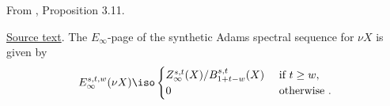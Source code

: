 \begin{proposition}
\label{paper:3.11}
From \cite{LWX126}, Proposition 3.11.\par

\href{paper/main.tex.html#L841}{Source text}.
\label{prop:30e8b746}
    The $E_\infty$-page of the synthetic Adams spectral sequence for $\nu X$ is given by
    $$E_\infty^{s,t,w}(\nu X)\iso\begin{cases}
        Z_\infty^{s,t}(X)/B_{1+t-w}^{s,t}(X) & \text{ if } t \ge w,\\
        0 & \text{ otherwise }.
    \end{cases}$$



\end{proposition}
